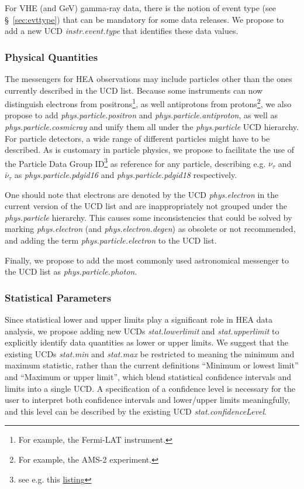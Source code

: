 \documentclass[11pt,a4paper]{ivoa}
\begin{document}
For \gls{VHE} (and GeV) gamma-ray data, there is the notion of event type (see \S~\ref{sec:evttype}) that can be mandatory for some data releases.  We propose to add a new UCD {\em instr.event.type\/} that identifies these data values.

\subsubsection{Physical Quantities}

The messengers for \gls{HEA} observations may include particles other than the ones currently described in the UCD list.  Because some instruments can now distinguish electrons from positrons\footnote{For example, the Fermi-LAT instrument.}, as well antiprotons from protons\footnote{For example, the AMS-2 experiment.}, we also propose to add {\em phys.particle.positron\/} and {\em phys.particle.antiproton\/}, as well as {\em phys.particle.cosmicray\/} and unify them all under the {\em phys.particle\/} UCD hierarchy. For particle detectors, a wide range of different particles might have to be described. As is customary in particle physics, we propose to facilitate the use of the Particle Data Group ID\footnote{see e.g. this \href{https://www.phy.bnl.gov/twister/bee/particles/}{listing}} as reference for any particle, describing e.g. $\nu_{\tau}$ and $\bar{\nu}_{\tau}$ as {\em phys.particle.pdgid16\/} and {\em phys.particle.pdgid18\/} respectively.

One should note that electrons are denoted by the UCD {\em phys.electron\/} in the current version of the UCD list \citep{2024ivoa.spec.1218C} and are inappropriately not grouped under the {\em phys.particle\/} hierarchy.  This causes some inconsistencies that could be solved by marking {\em phys.electron\/} (and {\em phys.electron.degen\/}) as obsolete or not recommended, and adding the term  {\em phys.particle.electron\/} to the UCD list.

Finally, we propose to add the most commonly used astronomical messenger to the UCD list as {\em phys.particle.photon\/}.

\subsubsection{Statistical Parameters}

Since statistical lower and upper limits play a significant role in \gls{HEA} data analysis, we propose adding new UCDs {\em stat.lowerlimit\/} and {\em stat.upperlimit\/} to explicitly identify data quantities as lower or upper limits.  We suggest that the existing UCDs {\em stat.min\/} and {\em stat.max\/} be restricted to meaning the minimum and maximum statistic, rather than the current definitions ``Minimum or lowest limit'' and ``Maximum or upper limit'', which blend statistical confidence intervals and limits into a  single UCD\null.  A specification of a confidence level is necessary for the user to interpret both confidence intervals and lower/upper limits meaningfully, and this level can be described by the existing UCD {\em stat.confidenceLevel\/}.
\end{document}

